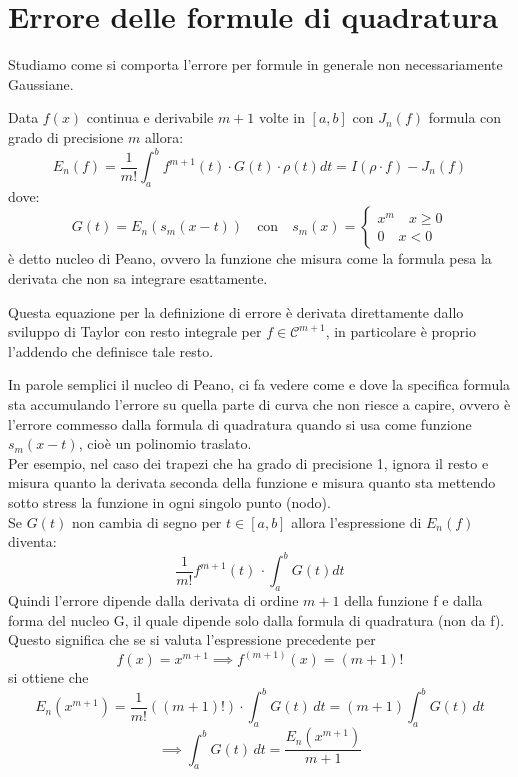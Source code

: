 \documentclass[12pt,a4paper,]{report}
\begin{document}
\section{Errore delle formule di quadratura}
Studiamo come si comporta l'errore per formule in generale non necessariamente Gaussiane.
\begin{teorema}
Data $f(x)$ continua e derivabile $m+1$ volte in $[a,b]$ con $J_n(f)$ formula con grado di precisione $m$ allora:
\[
\boxed{E_n(f) = \frac{1}{m!} \int_a^b f^{m+1}(t) \cdot G(t) \cdot \rho(t) dt}  = I(\rho \cdot f) - J_n(f)
\]
dove:
\[
\boxed{G(t) = E_n(s_m(x-t))} \quad \text{con} \quad s_m(x) = 
\begin{cases}
    x^m \quad x\geq 0 \\
    0 \quad x<0
\end{cases}
\]
è detto nucleo di Peano, ovvero la funzione che misura come la formula pesa la derivata che non sa integrare esattamente.
\end{teorema}
\begin{nota}
    Questa equazione per la definizione di errore è derivata direttamente dallo sviluppo di Taylor con resto integrale per $f\in\mathcal{C}^{m+1}$, in particolare è proprio l'addendo che definisce tale resto.
\end{nota}
In parole semplici il nucleo di Peano, ci fa vedere come e dove la specifica formula sta accumulando l'errore su quella parte di curva che non riesce a capire, ovvero è l'errore commesso dalla formula di quadratura quando si usa come funzione $s_m(x-t)$, cioè un polinomio traslato.\\
Per esempio, nel caso dei trapezi che ha grado di precisione 1, ignora il resto e misura quanto la derivata seconda della funzione e misura quanto sta mettendo sotto stress la funzione in ogni singolo punto (nodo).\\
Se $G(t)$ non cambia di segno per $t\in[a,b]$ allora l'espressione di $E_n(f)$ diventa:
\[
\frac{1}{m!} f^{m+1}(t) \, \cdot \int_a^b G(t) dt
\]
Quindi l'errore dipende dalla derivata di ordine $m+1$ della funzione f e dalla forma del nucleo G, il quale dipende solo dalla formula di quadratura (non da f).\\
Questo significa che se si valuta l'espressione precedente per 
\[f(x) = x^{m+1}\implies f^{(m+1)}(x) = (m + 1)!\]
si ottiene che
\[
E_n(x^{m+1}) = \frac{1}{m!} ((m + 1)!) \cdot \int_a^b G(t)\,dt = (m + 1) \int_a^b G(t)\,dt
\]
\[
\implies \int_a^b G(t)\,dt = \frac{E_n(x^{m+1})}{m + 1}
\]
\end{document}

